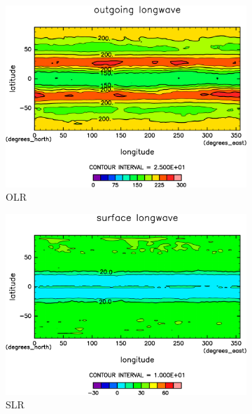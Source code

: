 \documentclass[body]{subfiles}
\begin{document}
\begin{figure}[t]
	\centering
	\begin{subfigure}{.4\textwidth}
		\centering
		\includegraphics[width=\textwidth]{S1600/OLR,time=3650:4015-crop-rotate.pdf}
		\caption{OLR \hmu*{[W/m^{-2}]}}\label{S1600OLR}
	\end{subfigure}
	\begin{subfigure}{.4\textwidth}
		\centering
		\includegraphics[width=\textwidth]{S1600/SLR,time=3650:4015-crop-rotate.pdf}
		\caption{SLR\hmu*{[W/m^{-2}]}}\label{S1600SLR}
	\end{subfigure}
	\begin{subfigure}{.4\textwidth}
		\centering

\end{subfigure}
\end{figure}
\end{document}
